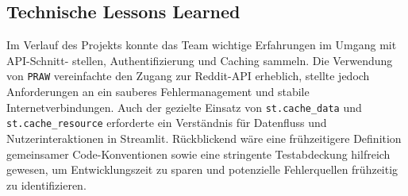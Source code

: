 \subsection{Technische Lessons Learned}
Im Verlauf des Projekts konnte das Team wichtige Erfahrungen im Umgang mit API-Schnitt- \newline
stellen, Authentifizierung und Caching sammeln. Die Verwendung von \texttt{PRAW} vereinfachte den Zugang zur Reddit-API erheblich, stellte jedoch Anforderungen an ein sauberes Fehlermanagement und stabile Internetverbindungen. Auch der gezielte Einsatz von \newline
\texttt{st.cache\_data} und \texttt{st.cache\_resource} erforderte ein Verständnis für Datenfluss und Nutzerinteraktionen in Streamlit. Rückblickend wäre eine frühzeitigere Definition gemeinsamer Code-Konventionen sowie eine stringente Testabdeckung hilfreich gewesen, um Entwicklungszeit zu sparen und potenzielle Fehlerquellen frühzeitig zu identifizieren.